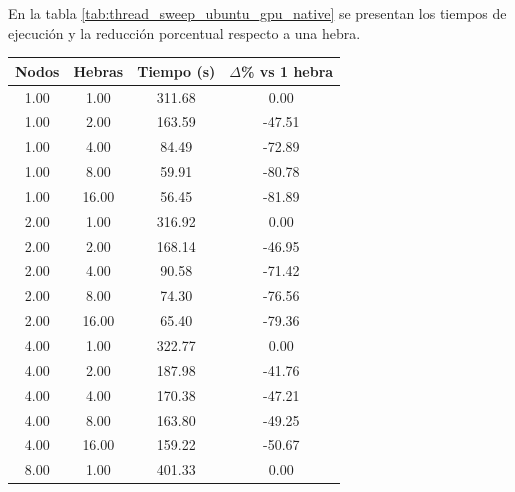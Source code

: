 En la tabla \ref{tab:thread_sweep_ubuntu_gpu_native} se presentan los tiempos de ejecución y la reducción porcentual respecto a una hebra.

\begin{table}[ht]
    \centering
    \begin{tabular}{|c|c|c|c|}
        \hline
        \textbf{Nodos} & \textbf{Hebras} & \textbf{Tiempo (s)} & \textbf{$\Delta$\% vs 1 hebra} \\
        \hline
        1.00           & 1.00            & 311.68              & 0.00                           \\
        1.00           & 2.00            & 163.59              & -47.51                         \\
        1.00           & 4.00            & 84.49               & -72.89                         \\
        1.00           & 8.00            & 59.91               & -80.78                         \\
        1.00           & 16.00           & 56.45               & -81.89                         \\
        2.00           & 1.00            & 316.92              & 0.00                           \\
        2.00           & 2.00            & 168.14              & -46.95                         \\
        2.00           & 4.00            & 90.58               & -71.42                         \\
        2.00           & 8.00            & 74.30               & -76.56                         \\
        2.00           & 16.00           & 65.40               & -79.36                         \\
        4.00           & 1.00            & 322.77              & 0.00                           \\
        4.00           & 2.00            & 187.98              & -41.76                         \\
        4.00           & 4.00            & 170.38              & -47.21                         \\
        4.00           & 8.00            & 163.80              & -49.25                         \\
        4.00           & 16.00           & 159.22              & -50.67                         \\
        8.00           & 1.00            & 401.33              & 0.00                           \\

\end{tabular}
\end{table}
